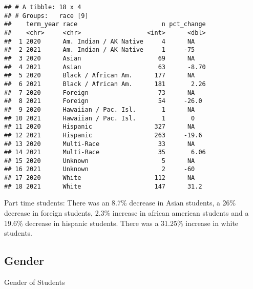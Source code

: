 \documentclass[]{article}
\begin{document}
\begin{verbatim}
## # A tibble: 18 x 4
## # Groups:   race [9]
##    term_year race                       n pct_change
##    <chr>     <chr>                  <int>      <dbl>
##  1 2020      Am. Indian / AK Native     4      NA   
##  2 2021      Am. Indian / AK Native     1     -75   
##  3 2020      Asian                     69      NA   
##  4 2021      Asian                     63      -8.70
##  5 2020      Black / African Am.      177      NA   
##  6 2021      Black / African Am.      181       2.26
##  7 2020      Foreign                   73      NA   
##  8 2021      Foreign                   54     -26.0 
##  9 2020      Hawaiian / Pac. Isl.       1      NA   
## 10 2021      Hawaiian / Pac. Isl.       1       0   
## 11 2020      Hispanic                 327      NA   
## 12 2021      Hispanic                 263     -19.6 
## 13 2020      Multi-Race                33      NA   
## 14 2021      Multi-Race                35       6.06
## 15 2020      Unknown                    5      NA   
## 16 2021      Unknown                    2     -60   
## 17 2020      White                    112      NA   
## 18 2021      White                    147      31.2
\end{verbatim}

Part time students: There was an 8.7\% decrease in Asian students, a
26\% decrease in foreign students, 2.3\% increase in african american
students and a 19.6\% decrease in hispanic students. There was a 31.25\%
increase in white students.

\hypertarget{gender}{%
\subsection{Gender}\label{gender}}

Gender of Students
\end{document}
